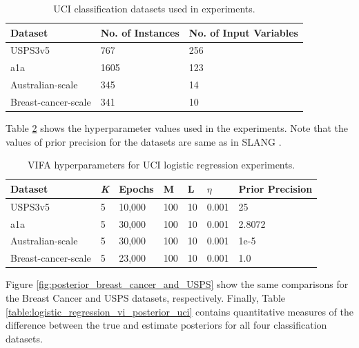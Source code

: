 \documentclass[10pt]{article} %
\begin{document}
\begin{table}[!h]
\caption{UCI classification datasets used in experiments.}
\label{table:uci_classification_datasets}
\begin{center}
\begin{tabular}{l|ll}
\textbf{Dataset}    & \textbf{No. of  Instances} & \textbf{No. of Input Variables}  \\ \hline
USPS3v5             & 767                        & 256                                                    \\
a1a                 & 1605                       & 123                                                \\
Australian-scale    & 345                        & 14                                                   \\
Breast-cancer-scale & 341                        & 10                                                  
\end{tabular}
\end{center}
\end{table}

Table \ref{table:vifa_uci_logistic_hyperparameters} shows the hyperparameter values used in the experiments. Note that the values of prior precision for the datasets are same as in SLANG \cite{mishkin2018}.

\begin{table}[!h]
\caption{VIFA hyperparameters for UCI logistic regression experiments.}
\label{table:vifa_uci_logistic_hyperparameters}
\begin{center}
\begin{tabular}{l|llllll}
\textbf{Dataset}    & \textit{K} & \textbf{Epochs} & M   & L  & $\eta$   & \textbf{Prior Precision} \\ \hline
USPS3v5             & 5          & 10,000          & 100 & 10 & 0.001 & 25                       \\
a1a                 & 5          & 30,000          & 100 & 10 & 0.001 & 2.8072                   \\
Australian-scale    & 5          & 30,000          & 100 & 10 & 0.001 & 1e-5                     \\
Breast-cancer-scale & 5          & 23,000          & 100 & 10 & 0.001 & 1.0                     
\end{tabular}
\end{center}
\end{table}

Figure \ref{fig:posterior_breast_cancer_and_USPS} show the same comparisons for the Breast Cancer and USPS datasets, respectively. Finally, Table \ref{table:logistic_regression_vi_posterior_uci} contains quantitative measures of the difference between the true and estimate posteriors for all four classification datasets.
\end{document}
